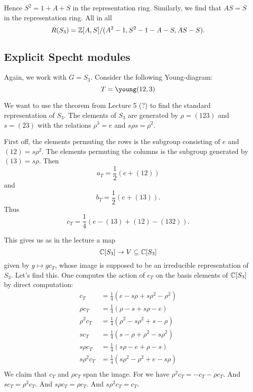 \documentclass[11pt, english]{article}
\begin{document}
Hence $S^2=1+A+S$ in the representation ring. Similarly, we find that $AS=S$ in the representation ring. All in all
$$
R(S_3) = \mathbb{Z}[A,S]/(A^2-1,S^2-1-A-S,AS-S).
$$

\subsection{Explicit Specht modules}

Again, we work with $G=S_3$. Consider the following Young-diagram:
$$
T = \young(12,3)
$$

We want to use the theorem from Lecture 5 (?) to find the standard representation of $S_3$. The elements of $S_3$ are generated by $\rho=(123)$ and $s=(23)$ with the relations $\rho^3=e$ and $s\rho s =\rho^2$. 

First off, the elements permuting the rows is the subgroup consisting of $e$ and $(12)=s\rho^2$. The elements permuting the columns is the subgroup generated by $(13)=s\rho$. Then
$$
a_T = \frac 12 \left(e+(12)\right)
$$
and
$$
b_T = \frac 12 \left( e+(13) \right).
$$
Thus
$$
c_T= \frac 14 \left( e -(13) + (12)-(132) \right).
$$

This gives us as in the lecture a map
$$
\mathbb{C}[S_3] \to V \subseteq \mathbb{C}[S_3]
$$
given by $g \mapsto g c_T$, whose image is supposed to be an irreducible representation of $S_3$. Let's find this. One computes the action of $c_T$ on the basis elements of $\mathbb{C}[S_3]$ by direct computation:
\begin{align*}
  c_T      &= \frac 14 \left( e -s\rho  + s\rho^2-\rho^2 \right) \\
 \rho c_T  &= \frac 14 \left( \rho - s + s\rho -e \right) \\
 \rho^2 c_T &= \frac 14 \left( \rho^2 - s\rho^2 + s -\rho \right) \\
sc_T &= \frac 14 \left( s-\rho + \rho^2-s\rho^2 \right)  \\
s \rho c_T &= \frac 14 \left( s \rho -e+\rho-s \right) \\
s \rho^2 c_T &= \frac 14 \left( s\rho^2-\rho^2+e - s\rho \right) \\
\end{align*}
We claim that $c_T$ and $\rho c_T$ span the image. For we have $\rho^2 c_T = -c_T-\rho c_T$. And $sc_T=\rho^2 c_T$. And $s \rho c_T = \rho c_T$. And $s \rho^2 c_T = c_T$. 
\end{document}
